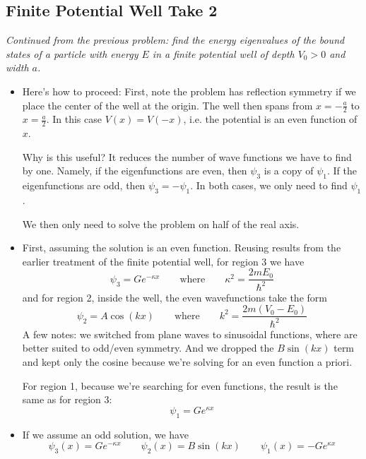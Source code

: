 \documentclass[11pt, a4paper]{article}
\newcommand{\eqtext}[1]{\qquad \text{#1} \qquad}
\begin{document}
\subsection{Finite Potential Well Take 2}
\textit{Continued from the previous problem: find the energy eigenvalues of the bound states of a particle with energy $ E $ in a finite potential well of depth $ V_{0} > 0 $ and width $ a $.}
\begin{itemize}
	\item Here's how to proceed: First, note the problem has reflection symmetry if we place the center of the well at the origin. The well then spans from $ x = -\frac{a}{2} $ to $ x = \frac{a}{2} $. In this case $ V(x) = V(-x) $, i.e. the potential is an even function of $ x $. 
	
	Why is this useful? It reduces the number of wave functions we have to find by one. Namely, if the eigenfunctions are even, then $ \psi_{3} $ is a copy of $ \psi_{1} $. If the eigenfunctions are odd, then $ \psi_{3} = - \psi_{1} $. In both cases, we only need to find $ \psi_{1} $. 
	
	We then only need to solve the problem on half of the real axis.
	

		
	\item First, assuming the solution is an even function. Reusing results from the earlier treatment of the finite potential well, for region 3 we have
	\begin{equation*}
		\psi_{3} = Ge^{-\kappa x} \eqtext{where} \kappa^{2} = \frac{2mE_{0}}{\hbar^{2}}
	\end{equation*}
	and for region 2, inside the well, the even wavefunctions take the form
	\begin{equation*}
		\psi_{2} = A \cos(kx) \eqtext{where} k^{2} = \frac{2m(V_{0} - E_{0})}{\hbar^{2}}
	\end{equation*}
	A few notes: we switched from plane waves to sinusoidal functions, where are better suited to odd/even symmetry. And we dropped the $B\sin(kx)$ term and kept only the cosine because we're solving for an even function a priori.
	
	For region 1, because we're searching for even functions, the result is the same as for region 3:
	\begin{equation*}
		\psi_{1} = G e^{\kappa x}
	\end{equation*}
	
	\item If we assume an odd solution, we have
	\begin{equation*}
		\psi_{3}(x) = G e^{-\kappa x} \qquad \psi_{2}(x) = B \sin (kx) \qquad \psi_{1}(x) = -Ge^{\kappa x}
	\end{equation*}
	

\end{itemize}
\end{document}
